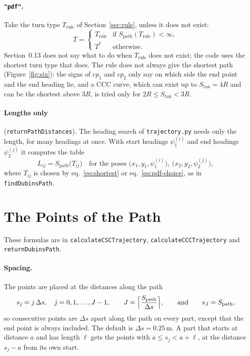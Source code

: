 \documentclass[10pt]{article}
\newcommand{\code}[1]{\texttt{#1}}
\newcommand{\Stan}{S_{\tan}}
\newcommand{\Spath}{S_{\mathrm{path}}}
\begin{document}
\paragraph{\code{"pdf"}.} Take the turn type $T_{\mathrm{rule}}$ of Section~\ref{sec:rule}, unless it does not exist:
\begin{equation}
  T = \begin{cases}
        T_{\mathrm{rule}} & \text{if } \Spath(T_{\mathrm{rule}}) < \infty,\\
        T^{*}             & \text{otherwise.}
      \end{cases}
  \label{eq:pdf-choice}
\end{equation}
Section~0.13 does not say what to do when $T_{\mathrm{rule}}$ does not exist; the code uses the shortest turn type that
does. The rule does not always give the shortest path (Figure~\ref{fig:six}): the signs of $cp_1$ and $cp_2$ only say
on which side the end point and the end heading lie, and a CCC curve, which can exist up to $\Stan = 4R$ and can be the
shortest above $3R$, is tried only for $2R \le \Stan < 3R$.

\paragraph{Lengths only} (\code{returnPathDistances}). The heading search of \code{trajectory.py} needs only the
length, for many headings at once. With start headings $\psi_1^{(i)}$ and end headings $\psi_2^{(j)}$ it computes the
table
\begin{equation}
  L_{ij} = \Spath\bigl(T_{ij}\bigr) \quad\text{for the poses } \bigl(x_1, y_1, \psi_1^{(i)}\bigr),\ \bigl(x_2, y_2, \psi_2^{(j)}\bigr),
  \label{eq:table}
\end{equation}
where $T_{ij}$ is chosen by eq.~\eqref{eq:shortest} or eq.~\eqref{eq:pdf-choice}, as in \code{findDubinsPath}.

\section{The Points of the Path}

These formulas are in \code{calculateCSCTrajectory}, \code{calculateCCCTrajectory} and \code{returnDubinsPath}.

\paragraph{Spacing.} The points are placed at the distances along the path
\begin{equation}
  s_j = j\,\Delta s, \quad j = 0, 1, \ldots, J - 1, \qquad J = \Bigl\lceil \frac{\Spath}{\Delta s} \Bigr\rceil,
  \qquad\text{and}\qquad s_J = \Spath,
  \label{eq:spacing}
\end{equation}
so consecutive points are $\Delta s$ apart along the path on every part, except that the end point is always
included. The default is $\Delta s = 0.25$\,m. A part that starts at distance $a$ and has length $\ell$ gets the
points with $a \le s_j < a + \ell$, at the distance $s_j - a$ from its own start.
\end{document}
